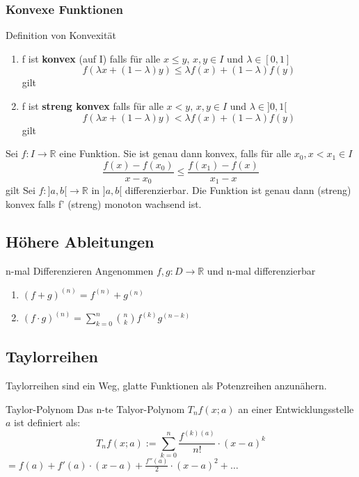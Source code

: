 \documentclass[a4paper,10pt]{article}
\def\R{\mathbb{R}}
\begin{document}
\subsubsection{Konvexe Funktionen}
\begin{mainbox}{Definition von Konvexität}
  \begin{enumerate}[leftmargin=*]
    \item f ist \textbf{konvex} (auf I) falls für alle $x \leq y,\, x,y\in I$ und $\lambda \in [0,1]$ \[f(\lambda x + (1-\lambda)y) \leq \lambda f(x) + (1-\lambda)f(y)\] gilt
    \item f ist \textbf{streng konvex} falls für alle $x < y, \, x,y \in I$ und $\lambda\in]0,1[$ \[ f(\lambda x + (1-\lambda)y) < \lambda f(x) + (1-\lambda)f(y) \] gilt
  \end{enumerate}
\end{mainbox}
Sei $f: I \to \R$ eine Funktion. Sie ist genau dann konvex, falls für alle $x_0, x < x_1 \in I$ \[\frac{f(x)-f(x_0)}{x-x_0}\leq \frac{f(x_1)-f(x)}{x_1-x}\] gilt
Sei $f:]a,b[ \to \R$ in $]a,b[$ differenzierbar. Die Funktion ist genau dann (streng) konvex falls f' (streng) monoton wachsend ist.

\subsection{Höhere Ableitungen}
\begin{mainbox}{n-mal Differenzieren}
  Angenommen $f,g: D\to \R$ und n-mal differenzierbar
  \begin{enumerate}[leftmargin=*]
    \item $(f+g)^{(n)} = f^{(n)} + g^{(n)}$
    \item $(f\cdot g)^{(n)} = \sum\limits_{k=0}^{n}\binom{n}{k}f^{(k)}g^{(n-k)}$ 
  \end{enumerate}
\end{mainbox}

\subsection{Taylorreihen}
Taylorreihen sind ein Weg, glatte Funktionen als Potenzreihen anzunähern.

\begin{subbox}{Taylor-Polynom}
 Das n-te Talyor-Polynom $T_n f(x; a)$ an einer Entwicklungsstelle $a$ ist definiert als:
 $$T_n f(x; a) := \sum_{k=0}^{n} \frac{f^{(k) (a)}}{n!} \cdot (x - a)^k$$ 
 $ = f(a) + f'(a) \cdot (x-a) + \frac{f''(a)}{2} \cdot (x - a)^2 + \ldots$
\end{subbox}
\end{document}

